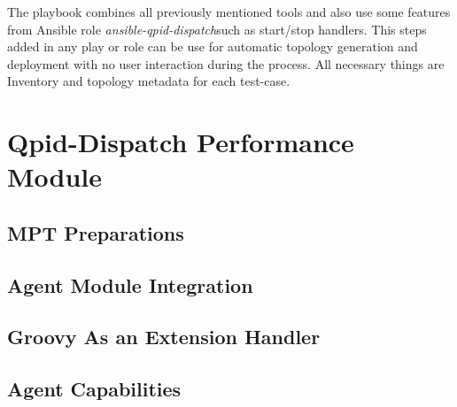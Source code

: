 The playbook combines all previously mentioned tools and also use some features from Ansible role \emph{ansible-qpid-dispatch}\footnotemark such as start/stop handlers. This steps added in any play or role can be use for automatic topology generation and deployment with no user interaction during the process. All necessary things are Inventory and topology metadata for each test-case.


\section{Qpid-Dispatch Performance Module}

\subsection{MPT Preparations}
\label{MPT Preparations}

\subsection{Agent Module Integration}

\subsection{Groovy As an Extension Handler}

\subsection{Agent Capabilities}
